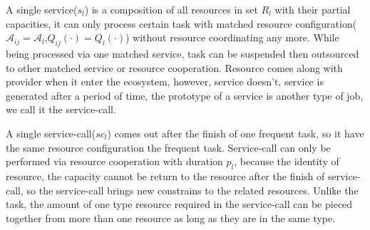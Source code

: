 A single service($s_l$) is a composition of all resources in set $R_l$ with their partial capacities, it can only process certain task with matched resource configuration($\mathcal{A}_{ij}=\mathcal{A}_l$,$ Q_{ij}(\cdot)=Q_l(\cdot)$) without resource coordinating any more. While being processed via one matched service, task can be suspended then outsourced to other matched service or resource cooperation.
Resource comes along with provider when it enter the ecosystem, however, service doesn't, service is generated after a period of time, the prototype of a service is another type of job, we call it the service-call.

A single service-call($sc_l$) comes out after the finish of one frequent task, so it have the same resource configuration the frequent task. Service-call can only be performed via resource cooperation with duration $p_l$, because the identity of resource, the capacity cannot be return to the resource after the finish of service-call, so the service-call brings new constrains to the related resources. Unlike the task, the amount of one type resource required in the service-call can be pieced together from more than one resource as long as they are in the same type.

